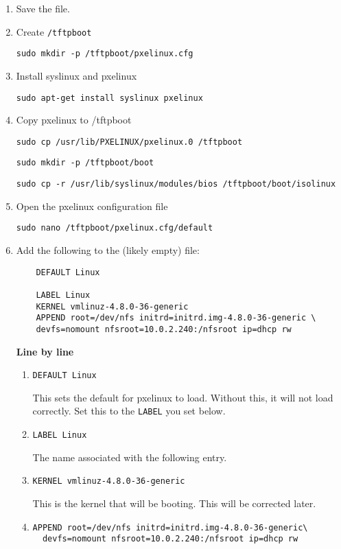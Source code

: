\documentclass{article}
\begin{document}
\begin{flushleft}
\begin{enumerate}
  \item Save the file.
  \item Create \verb|/tftpboot|

  \verb|sudo mkdir -p /tftpboot/pxelinux.cfg|

  \item Install syslinux and pxelinux

  \verb|sudo apt-get install syslinux pxelinux|
  \item Copy pxelinux to /tftpboot

  \verb|sudo cp /usr/lib/PXELINUX/pxelinux.0 /tftpboot|

  \verb|sudo mkdir -p /tftpboot/boot|

  \verb|sudo cp -r /usr/lib/syslinux/modules/bios /tftpboot/boot/isolinux|

  \item Open the pxelinux configuration file

  \verb|sudo nano /tftpboot/pxelinux.cfg/default|

  \item Add the following to the (likely empty) file:

  \begin{verbatim}
    DEFAULT Linux

    LABEL Linux
    KERNEL vmlinuz-4.8.0-36-generic
    APPEND root=/dev/nfs initrd=initrd.img-4.8.0-36-generic \
    devfs=nomount nfsroot=10.0.2.240:/nfsroot ip=dhcp rw
  \end{verbatim}

  \textbf{Line by line}
  \begin{enumerate}
    \item \verb|DEFAULT Linux|

    This sets the default for pxelinux to load.  Without this, it will not load correctly.  Set this to the \verb|LABEL| you set below.

    \item \verb|LABEL Linux|

    The name associated with the following entry.

    \item \verb|KERNEL vmlinuz-4.8.0-36-generic|

    This is the kernel that will be booting.  This will be corrected later.

    \item \begin{verbatim}APPEND root=/dev/nfs initrd=initrd.img-4.8.0-36-generic\
  devfs=nomount nfsroot=10.0.2.240:/nfsroot ip=dhcp rw\end{verbatim}


\end{enumerate}
\end{enumerate}
\end{flushleft}
\end{document}
